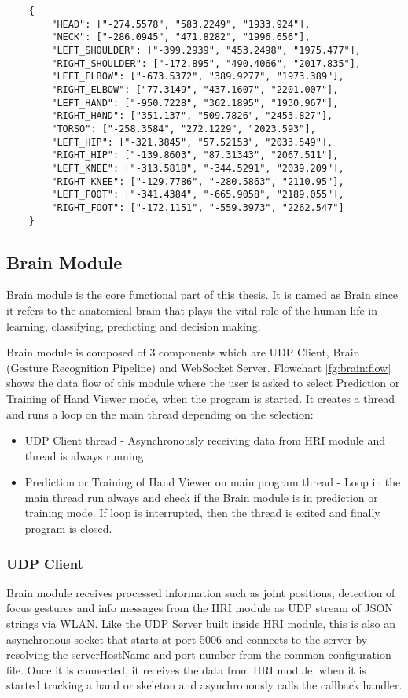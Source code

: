  \begin{lstlisting}
	{
		"HEAD": ["-274.5578", "583.2249", "1933.924"],
		"NECK": ["-286.0945", "471.8282", "1996.656"],
		"LEFT_SHOULDER": ["-399.2939", "453.2498", "1975.477"],
		"RIGHT_SHOULDER": ["-172.895", "490.4066", "2017.835"],
		"LEFT_ELBOW": ["-673.5372", "389.9277", "1973.389"],
		"RIGHT_ELBOW": ["77.3149", "437.1607", "2201.007"],
		"LEFT_HAND": ["-950.7228", "362.1895", "1930.967"],
		"RIGHT_HAND": ["351.137", "509.7826", "2453.827"],
		"TORSO": ["-258.3584", "272.1229", "2023.593"],
		"LEFT_HIP": ["-321.3845", "57.52153", "2033.549"],
		"RIGHT_HIP": ["-139.8603", "87.31343", "2067.511"],
		"LEFT_KNEE": ["-313.5818", "-344.5291", "2039.209"],
		"RIGHT_KNEE": ["-129.7786", "-280.5863", "2110.95"],
		"LEFT_FOOT": ["-341.4384", "-665.9058", "2189.055"],
		"RIGHT_FOOT": ["-172.1151", "-559.3973", "2262.547"]
	}
 \end{lstlisting}
 \label{code:skeleton:data}
 
\subsection{Brain Module} Brain module is the core functional part of this thesis. It is named as Brain since it refers to the anatomical brain that plays the vital role of the human life in learning, classifying, predicting and decision making. 

Brain module is composed of 3 components which are UDP Client, Brain (Gesture Recognition Pipeline) and WebSocket Server. Flowchart \ref{fg:brain:flow} shows the data flow of this module where the user is asked to select Prediction or Training of Hand Viewer mode, when the program is started. It creates a thread and runs a loop on the main thread depending on the selection: 

\begin{itemize}
	\item UDP Client thread - Asynchronously receiving data from HRI module and thread is always running.
	\item Prediction or Training of Hand Viewer on main program thread -  Loop in the main thread run always and check if the Brain module is in prediction or training mode. If loop is interrupted, then the thread is exited and finally program is closed.	
\end{itemize}



\subsubsection{UDP Client}
Brain module receives processed information such as joint positions, detection of focus gestures and info messages from the HRI module as UDP stream of JSON strings via WLAN. Like the UDP Server built inside HRI module, this is also an asynchronous socket that starts at port 5006 and connects to the server by resolving the serverHostName and port number from the common configuration file. Once it is connected, it receives the data from HRI module, when it is started tracking a hand or skeleton and asynchronously calls the callback handler.

